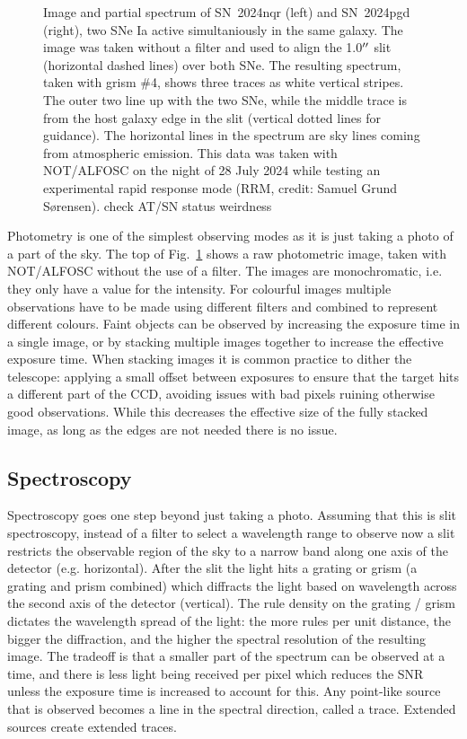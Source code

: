 \documentclass[a4paper,oneside,12pt, class=Latex/Classes/PhDthesisPSnPDF, crop=false]{standalone}
\begin{document}
\begin{figure}
    \caption{Image and partial spectrum of SN~2024nqr (left) and SN~2024pgd (right), two SNe Ia active simultaniously in the same galaxy. The image was taken without a filter and used to align the 1.0$^{\prime\prime}$ slit (horizontal dashed lines) over both SNe. The resulting spectrum, taken with grism \#4, shows three traces as white vertical stripes. The outer two line up with the two SNe, while the middle trace is from the host galaxy edge in the slit (vertical dotted lines for guidance). The horizontal lines in the spectrum are sky lines coming from atmospheric emission. This data was taken with NOT/ALFOSC on the night of 28 July 2024 while testing an experimental rapid response mode (RRM, credit: Samuel Grund S\o rensen). \color{red}check AT/SN status weirdness \color{black}}
    \label{phot_spec_example}
\end{figure}


Photometry is one of the simplest observing modes as it is just taking a photo of a part of the sky. The top of Fig.~\ref{phot_spec_example} shows a raw photometric image, taken with NOT/ALFOSC without the use of a filter. The images are monochromatic, i.e. they only have a value for the intensity. For colourful images multiple observations have to be made using different filters and combined to represent different colours. Faint objects can be observed by increasing the exposure time in a single image, or by stacking multiple images together to increase the effective exposure time. When stacking images it is common practice to dither the telescope: applying a small offset between exposures to ensure that the target hits a different part of the CCD, avoiding issues with bad pixels ruining otherwise good observations. While this decreases the effective size of the fully stacked image, as long as the edges are not needed there is no issue.


\subsection{Spectroscopy}
Spectroscopy goes one step beyond just taking a photo. Assuming that this is slit spectroscopy, instead of a filter to select a wavelength range to observe now a slit restricts the observable region of the sky to a narrow band along one axis of the detector (e.g. horizontal). After the slit the light hits a grating or grism (a grating and prism combined) which diffracts the light based on wavelength across the second axis of the detector (vertical). The rule density on the grating / grism dictates the wavelength spread of the light: the more rules per unit distance, the bigger the diffraction, and the higher the spectral resolution of the resulting image. The tradeoff is that a smaller part of the spectrum can be observed at a time, and there is less light being received per pixel which reduces the SNR unless the exposure time is increased to account for this. Any point-like source that is observed becomes a line in the spectral direction, called a trace. Extended sources create extended traces.
\end{document}
